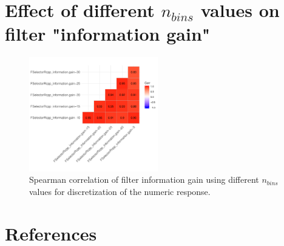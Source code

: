 \documentclass[letterpaper, journal]{IEEEtran}
\begin{document}
\section{Effect of different \texttt{$n_{bins}$} values on filter "information gain"}

\begin{figure} [h]
\begin{center}
\includegraphics[width=0.5\textwidth] {correlation-nbins-1.pdf}
\caption{Spearman correlation of filter information gain using different \texttt{$n_{bins}$} values for discretization of the numeric response.}
\label{fig:correlation-nbins}
\end{center}
\end{figure}




\section*{References}
\end{document}
